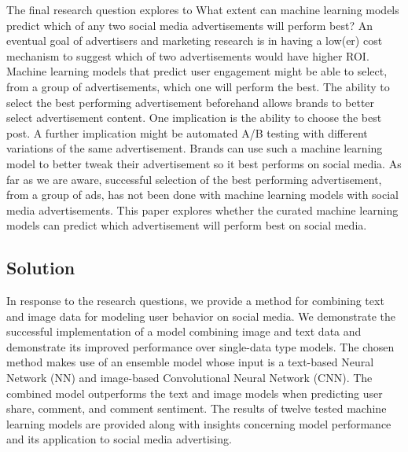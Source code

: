 \documentclass[mksc,blindrev]{informs3} %
\begin{document}
The final research question explores to What extent can machine learning models predict which of any two social media advertisements will perform best? An eventual goal of advertisers and marketing research is in having a low(er) cost mechanism to suggest which of two advertisements would have higher ROI. Machine learning models that predict user engagement might be able to select, from a group of advertisements, which one will perform the best. The ability to select the best performing advertisement beforehand allows brands to better select advertisement content. One implication is the ability to choose the best post. A further implication might be automated A/B testing with different variations of the same advertisement. Brands can use such a machine learning model to better tweak their advertisement so it best performs on social media. As far as we are aware, successful selection of the best performing advertisement, from a group of ads, has not been done with machine learning models with social media advertisements. This paper explores whether the curated machine learning models can predict which advertisement will perform best on social media.

\subsection{Solution}

In response to the research questions, we provide a method for combining text and image data for modeling user behavior on social media. We demonstrate the successful implementation of a model combining image and text data and demonstrate its improved performance over single-data type models. The chosen method makes use of an ensemble model whose input is a text-based Neural Network (NN) and image-based Convolutional Neural Network (CNN). The combined model outperforms the text and image models when predicting user share, comment, and comment sentiment. The results of twelve tested machine learning models are provided along with insights concerning model performance and its application to social media advertising. 
\end{document}
